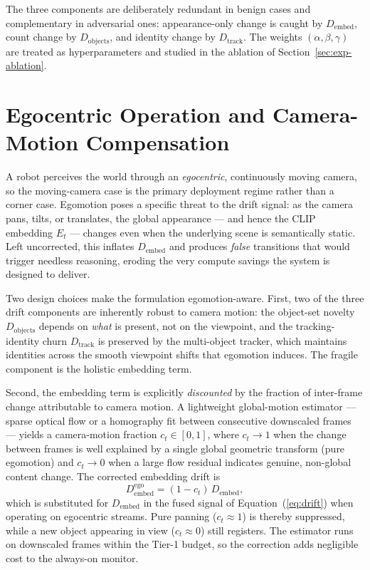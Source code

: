 The three components are deliberately redundant in benign cases and
complementary in adversarial ones: appearance-only change is caught by
$D_{\text{embed}}$, count change by $D_{\text{objects}}$, and identity change
by $D_{\text{track}}$. The weights $(\alpha, \beta, \gamma)$ are treated as
hyperparameters and studied in the ablation of
Section~\ref{sec:exp-ablation}.

\section{Egocentric Operation and Camera-Motion Compensation}
\label{sec:meth-egomotion}

A robot perceives the world through an \emph{egocentric}, continuously moving
camera, so the moving-camera case is the primary deployment regime rather than
a corner case. Egomotion poses a specific threat to the drift signal: as the
camera pans, tilts, or translates, the global appearance --- and hence the
CLIP embedding $E_t$ --- changes even when the underlying scene is
semantically static. Left uncorrected, this inflates $D_{\text{embed}}$ and
produces \emph{false} transitions that would trigger needless reasoning,
eroding the very compute savings the system is designed to deliver.

Two design choices make the formulation egomotion-aware. First, two of the
three drift components are inherently robust to camera motion: the object-set
novelty $D_{\text{objects}}$ depends on \emph{what} is present, not on the
viewpoint, and the tracking-identity churn $D_{\text{track}}$ is preserved by
the multi-object tracker, which maintains identities across the smooth
viewpoint shifts that egomotion induces. The fragile component is the holistic
embedding term.

Second, the embedding term is explicitly \emph{discounted} by the fraction of
inter-frame change attributable to camera motion. A lightweight global-motion
estimator --- sparse optical flow or a homography fit between consecutive
downscaled frames --- yields a camera-motion fraction $c_t \in [0,1]$, where
$c_t \to 1$ when the change between frames is well explained by a single
global geometric transform (pure egomotion) and $c_t \to 0$ when a large flow
residual indicates genuine, non-global content change. The corrected embedding
drift is
\begin{equation}
  D_{\text{embed}}^{\text{ego}} = (1 - c_t)\, D_{\text{embed}},
  \label{eq:dembed-ego}
\end{equation}
which is substituted for $D_{\text{embed}}$ in the fused signal of
Equation~(\ref{eq:drift}) when operating on egocentric streams. Pure panning
($c_t \!\approx\! 1$) is thereby suppressed, while a new object appearing in
view ($c_t \!\approx\! 0$) still registers. The estimator runs on downscaled
frames within the Tier-1 budget, so the correction adds negligible cost to the
always-on monitor.

